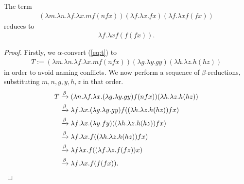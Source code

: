 \documentclass{article}
\begin{document}
\begin{claim*}[a]
	The term
	\begin{align}
		\label{eq:t}
		(\lambda m. \lambda n.\lambda f.\lambda x.mf(nfx))(\lambda f.\lambda x.fx)(\lambda f.\lambda x f(fx))
	\end{align}
	reduces to
	\begin{align*}
		\lambda f.\lambda x f(f(fx)).
	\end{align*}
	\begin{proof}
		Firstly, we $\alpha$-convert (\ref{eq:t}) to
		\begin{align*}
			T:=(\lambda m. \lambda n.\lambda f.\lambda x.mf(nfx))(\lambda g.\lambda y.gy)(\lambda h.\lambda z.h(hz))
		\end{align*}
		in order to avoid naming conflicts. We now perform a sequence of $\beta$-reductions,
		substituting $m,n,g,y,h,z$ in that order.
		\begin{align*}
			T
			 & \xrightarrow{\beta}(\lambda n.\lambda f.\lambda x.(\lambda g.\lambda y.gy)f(nfx))(\lambda h.\lambda z.h(hz)) \\
			 & \xrightarrow{\beta}\lambda f.\lambda x.(\lambda g.\lambda y.gy)f((\lambda h.\lambda z.h(hz))fx)              \\
			 & \xrightarrow{\beta}\lambda f.\lambda x.(\lambda y.fy)((\lambda h.\lambda z.h(hz))fx)                         \\
			 & \xrightarrow{\beta}\lambda f.\lambda x.f((\lambda h.\lambda z.h(hz))fx)                                      \\
			 & \xrightarrow{\beta}\lambda f\lambda x.f((\lambda f.\lambda z.f(fz))x)                                        \\
			 & \xrightarrow{\beta}\lambda f.\lambda x.f(f(fx)).
		\end{align*}
	\end{proof}
\end{claim*}
\end{document}
